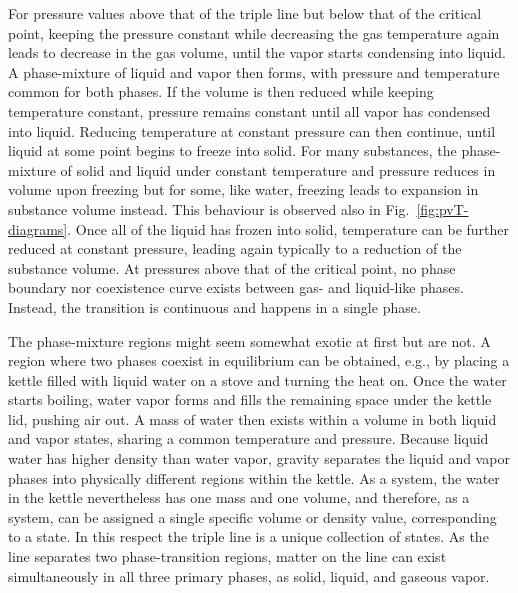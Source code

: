 For pressure values above that of the triple line but below that of the critical point, keeping the pressure constant while decreasing the gas temperature again leads to decrease in the gas volume, until the vapor starts condensing into liquid. A phase-mixture of liquid and vapor then forms, with pressure and temperature common for both phases. If the volume is then reduced while keeping temperature constant, pressure remains constant until all vapor has condensed into liquid. Reducing temperature at constant pressure can then continue, until liquid at some point begins to freeze into solid. For many substances, the phase-mixture of solid and liquid under constant temperature and pressure reduces in volume upon freezing but for some, like water, freezing leads to expansion in substance volume instead. This behaviour is observed also in Fig.~\ref{fig:pvT-diagrams}. Once all of the liquid has frozen into solid, temperature can be further reduced at constant pressure, leading again typically to a reduction of the substance volume. At pressures above that of the critical point, no phase boundary nor coexistence curve exists between gas- and liquid-like phases. Instead, the transition is continuous and happens in a single phase. 

The phase-mixture regions might seem somewhat exotic at first but are not. A region where two phases coexist in equilibrium can be obtained, e.g., by placing a kettle filled with liquid water on a stove and turning the heat on. Once the water starts boiling, water vapor forms and fills the remaining space under the kettle lid, pushing air out. A mass of water then exists within a volume in both liquid and vapor states, sharing a common temperature and pressure. Because liquid water has higher density than water vapor, gravity separates the liquid and vapor phases into physically different regions within the kettle. As a system, the water in the kettle nevertheless has one mass and one volume, and therefore, as a system, can be assigned a single specific volume or density value, corresponding to a state. In this respect the triple line is a unique collection of states. As the line separates two phase-transition regions, matter on the line can exist simultaneously in all three primary phases, as solid, liquid, and gaseous vapor.

